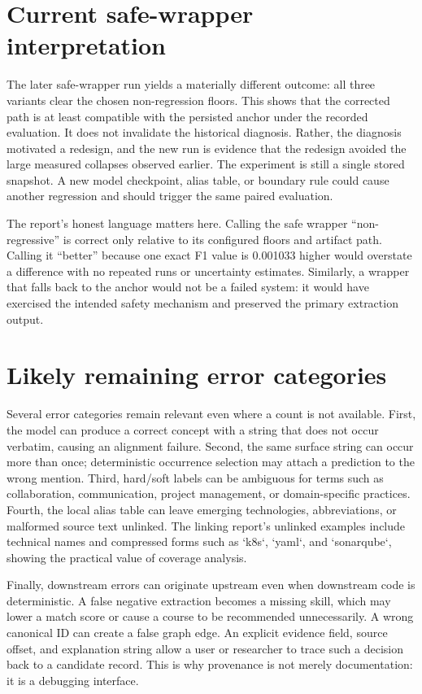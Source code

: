 \section{Current safe-wrapper interpretation}

The later safe-wrapper run yields a materially different outcome: all three variants clear the chosen non-regression floors. This shows that the corrected path is at least compatible with the persisted anchor under the recorded evaluation. It does not invalidate the historical diagnosis. Rather, the diagnosis motivated a redesign, and the new run is evidence that the redesign avoided the large measured collapses observed earlier. The experiment is still a single stored snapshot. A new model checkpoint, alias table, or boundary rule could cause another regression and should trigger the same paired evaluation.

The report's honest language matters here. Calling the safe wrapper ``non-regressive'' is correct only relative to its configured floors and artifact path. Calling it ``better'' because one exact F1 value is 0.001033 higher would overstate a difference with no repeated runs or uncertainty estimates. Similarly, a wrapper that falls back to the anchor would not be a failed system: it would have exercised the intended safety mechanism and preserved the primary extraction output.

\section{Likely remaining error categories}

Several error categories remain relevant even where a count is not available. First, the model can produce a correct concept with a string that does not occur verbatim, causing an alignment failure. Second, the same surface string can occur more than once; deterministic occurrence selection may attach a prediction to the wrong mention. Third, hard/soft labels can be ambiguous for terms such as collaboration, communication, project management, or domain-specific practices. Fourth, the local alias table can leave emerging technologies, abbreviations, or malformed source text unlinked. The linking report's unlinked examples include technical names and compressed forms such as `k8s`, `yaml`, and `sonarqube`, showing the practical value of coverage analysis.

Finally, downstream errors can originate upstream even when downstream code is deterministic. A false negative extraction becomes a missing skill, which may lower a match score or cause a course to be recommended unnecessarily. A wrong canonical ID can create a false graph edge. An explicit evidence field, source offset, and explanation string allow a user or researcher to trace such a decision back to a candidate record. This is why provenance is not merely documentation: it is a debugging interface.

